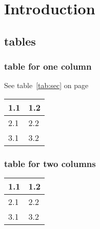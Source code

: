 \chapter{Introduction}

\section{tables}

\subsection{table for one column}
\blindtext[3] See table~\ref{tab:sec} on page~\pageref{tab:sec}
\begin{Table}
  \begin{tabularx}{\textwidth}[htb]{X X}
    \toprule
    1.1 & 1.2 \\
    \midrule
    2.1 & 2.2 \\
    3.1 & 3.2 \\
    \bottomrule
  \end{tabularx}
  \captionsetup{type=table}
  \caption{My first table.}\label{tab:first}
\end{Table}

\subsection{table for two columns}
\blindtext{}
\begin{table*}
  \caption{My second table.}\label{tab:sec}
  \begin{tabularx}{\textwidth}{X X}
    \toprule
    1.1 & 1.2 \\
    \midrule
    2.1 & 2.2 \\
    3.1 & 3.2 \\
    \bottomrule
  \end{tabularx}
\end{table*}
\blindtext{}\cite{DUMMY:1}
